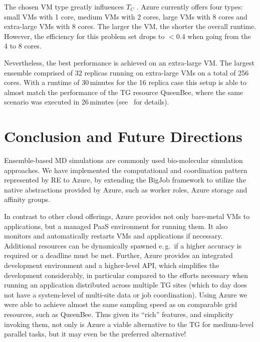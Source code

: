 \documentclass[conference,final]{IEEEtran}
\newcommand{\up}{\vspace*{-1em}}
\newcommand{\tc}{$T_{C}$ }
\begin{document}
The chosen VM type greatly influences \tc. Azure currently offers four
types: small VMs with 1 core, medium VMs with 2 cores, large VMs with 8 cores
and extra-large VMs with 8 cores. The larger the VM, the shorter the overall runtime.
However, the efficiency for this problem set drops to $<0.4$ when going from the 4 to 8 cores. 

Nevertheless, the best performance is achieved on an extra-large
VM. The largest ensemble comprised of 32 replicas running on
extra-large VMs on a total of 256 cores.  With a runtime of
30\,minutes for the 16 replica case this setup is able to almost match
the performance of the TG resource QueenBee, where the same scenario
was executed in 26\,minutes (see~\cite{repex_ptrsb} for details).

\up
\section{Conclusion and Future Directions}
\up

Ensemble-based MD simulations %
are commonly used bio-molecular simulation
approaches. %
We have implemented the computational and coordination pattern
represented by RE to Azure, by extending the BigJob framework to
utilize the native abstractions provided by Azure, such as worker
roles, Azure storage and affinity groups.

In contrast to other cloud offerings, Azure provides not only
bare-metal VMs to applications, but a managed PaaS environment for
running them. It also monitors and automatically restarts VMs and
applications if necessary. Additional resources can be dynamically
spawned e.\,g.\ if a higher accuracy is required or a deadline must be
met. Further, Azure provides an integrated development environment and
a higher-level API, which simplifies the development considerably, in
particular compared to the efforts necessary when running an
application distributed across multiple TG sites (which to day
does not have a system-level of multi-site data or job
coordination). Using Azure we were able to achieve almost the same
sampling speed as on comparable grid resources, such as QueenBee.
Thus given its ``rich'' features, and simplicity invoking them, not
only is Azure a viable alternative to the TG for medium-level parallel
tasks, but it may even be the preferred alternative!
\end{document}
